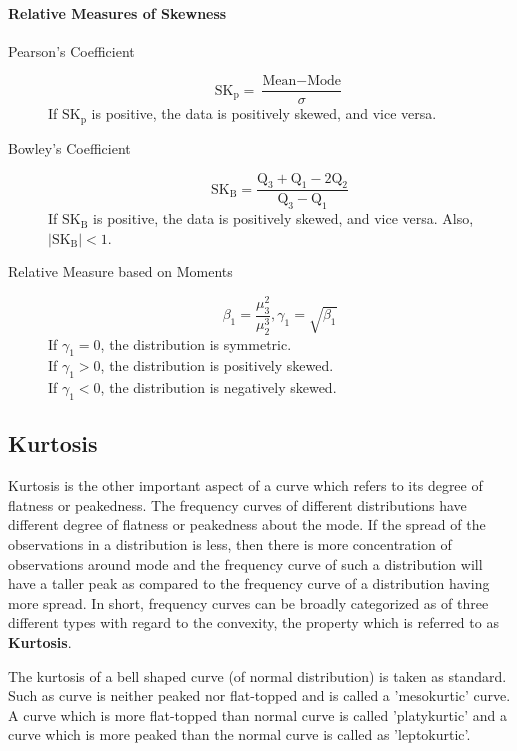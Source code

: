 \documentclass[
10pt, %
a4paper, %
]{report}
\begin{document}
\paragraph*{Relative Measures of Skewness}
\begin{description}
\item[Pearson's Coefficient]
\[\text{SK}_\text{p} = \frac{\text{Mean} - \text{Mode}}{\sigma} \]
If \(\text{SK}_\text{p}\) is positive, the data is positively skewed, and vice versa.
\item[Bowley's Coefficient]
\[\text{SK}_\text{B} = \frac{\mathrm{Q}_3+\mathrm{Q}_1 - 2\mathrm{Q}_2}{\mathrm{Q}_3 - \mathrm{Q}_1} \]
If \(\text{SK}_\text{B}\) is positive, the data is positively skewed, and vice versa. Also, \(|\text{SK}_\text{B}|<1\).
\item[Relative Measure based on Moments]
\[\beta_1 = \dfrac{\mu_3^2}{\mu_2^3}, \gamma_1 = \sqrt{\beta_1} \]
If \(\gamma_1 = 0\), the distribution is symmetric. \\
If \(\gamma_1 > 0\), the distribution is positively skewed.\\
If \(\gamma_1 < 0\), the distribution is negatively skewed.\\
\end{description}

\subsection*{Kurtosis}

Kurtosis is the other important aspect of a curve which refers to its degree of flatness or peakedness. The frequency curves of different distributions have different degree of flatness or peakedness about the mode. If the spread of the observations in a distribution is less, then there is more concentration of observations around mode and the frequency curve of such a distribution will have a taller peak as compared to the frequency curve of a distribution having more spread. In short, frequency curves can be broadly categorized as of three different types with regard to the convexity, the property which is referred to as \textbf{Kurtosis}.

The kurtosis of a bell shaped curve (of normal distribution) is taken as standard. Such as curve is neither peaked nor flat-topped and is called a 'mesokurtic' curve. A curve which is more flat-topped than normal curve is called 'platykurtic' and a curve which is more peaked than the normal curve is called as 'leptokurtic'.
\end{document}
